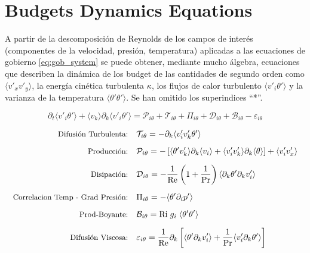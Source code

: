 \chapter{Budgets Dynamics Equations}

A partir de la descomposición de Reynolds de los campos de interés (componentes de la velocidad, presión, temperatura) aplicadas a las ecuaciones de gobierno \ref{eq:gob_system} se puede obtener, mediante mucho álgebra, ecuaciones que describen la dinámica de los budget de las cantidades de segundo orden como $\langle v'_x v'_y \rangle$, la energía cinética turbulenta $\kappa$, los flujos de calor turbulento $\langle v'_i \theta' \rangle$ y la varianza de la temperatura $\langle \theta' \theta' \rangle$. Se han omitido los superindices ``*''.

\begin{equation}
\partial_t \langle v'_i \theta' \rangle + \langle v_k \rangle \partial_k \langle v'_i \theta' \rangle = \mathcal{P}_{i\theta} + \mathcal{T}_{i\theta} + \Pi_{i\theta} + \mathcal{D}_{i\theta} + \mathcal{B}_{i\theta} - \varepsilon_{i\theta}
\end{equation}

\vspace*{-1cm}

\begin{equation}
\begin{aligned}
\mbox{\small Difusión Turbulenta:}\quad 
& \mathcal{T}_{i\theta} = - \partial_k \langle v'_i v'_k \theta' \rangle \\[2mm]
\mbox{\small Producción:}\quad 
& \mathcal{P}_{i\theta} = - \left[ \langle \theta' v'_k \rangle \partial_k \langle v_i \rangle + \langle v'_i v'_k \rangle \partial_k \langle \theta \rangle \right] + \langle v'_i v'_x \rangle \\[2mm]
\mbox{\small Disipación:}\quad 
& \mathcal{D}_{i\theta} = - \frac{1}{\text{Re}} \left(1 + \frac{1}{\text{Pr}} \right) \langle \partial_k \theta' \partial_k v'_i \rangle \\[2mm]
\mbox{\small Correlacion Temp - Grad Presión:}\quad 
& \Pi_{i\theta} = - \langle \theta' \partial_i p' \rangle \\[2mm]
\mbox{\small Prod-Boyante:}\quad 
& \mathcal{B}_{i\theta} = \text{Ri} \hspace{1mm} g_i  \hspace{1mm} \langle \theta' \theta' \rangle \\[2mm]
\mbox{\small Difusión Viscosa:}\quad 
& \varepsilon_{i\theta} = \frac{1}{\text{Re}} \partial_k \left[ \langle \theta' \partial_k v'_i \rangle 
+ \frac{1}{\text{Pr}} \langle v'_i \partial_k \theta' \rangle \right] \\[2mm]
\end{aligned}
\end{equation}

